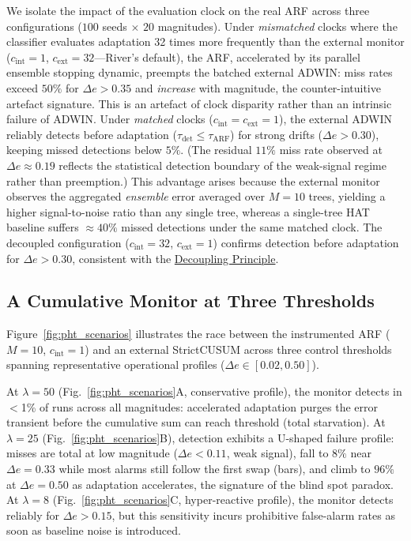 \documentclass[10pt,conference]{IEEEtran}
\theoremstyle{definition}
\begin{document}
We isolate the impact of the evaluation clock on the real ARF across three configurations ($100$ seeds $\times$ $20$ magnitudes). Under \emph{mismatched} clocks where the classifier evaluates adaptation 32 times more frequently than the external monitor ($c_{\mathrm{int}}{=}1$, $c_{\mathrm{ext}}{=}32$---River's default), the ARF, accelerated by its parallel ensemble stopping dynamic, preempts the batched external ADWIN: miss rates exceed $50\%$ for $\Delta e > 0.35$ and \emph{increase} with magnitude, the counter-intuitive artefact signature. This is an artefact of clock disparity rather than an intrinsic failure of ADWIN. Under \emph{matched} clocks ($c_{\mathrm{int}}{=}c_{\mathrm{ext}}{=}1$), the external ADWIN reliably detects before adaptation ($\tau_{\mathrm{det}} \le \tau_{\mathrm{ARF}}$) for strong drifts ($\Delta e > 0.30$), keeping missed detections below $5\%$. (The residual $11\%$ miss rate observed at $\Delta e \approx 0.19$ reflects the statistical detection boundary of the weak-signal regime rather than preemption.) This advantage arises because the external monitor observes the aggregated \emph{ensemble} error averaged over $M{=}10$ trees, yielding a higher signal-to-noise ratio than any single tree, whereas a single-tree HAT baseline suffers ${\approx}40\%$ missed detections under the same matched clock. The decoupled configuration ($c_{\mathrm{int}}{=}32$, $c_{\mathrm{ext}}{=}1$) confirms detection before adaptation for $\Delta e > 0.30$, consistent with the \hyperref[def:decoupling]{Decoupling Principle}.

\subsection{A Cumulative Monitor at Three Thresholds}\label{sec:complexity}

Figure~\ref{fig:pht_scenarios} illustrates the race between the instrumented ARF ($M = 10$, $c_{\mathrm{int}} = 1$) and an external StrictCUSUM across three control thresholds spanning representative operational profiles ($\Delta e \in [0.02, 0.50]$).

At $\lambda = 50$ (Fig.~\ref{fig:pht_scenarios}A, conservative profile), the monitor detects in $<$1\% of runs across all magnitudes: accelerated adaptation purges the error transient before the cumulative sum can reach threshold (total starvation). At $\lambda = 25$ (Fig.~\ref{fig:pht_scenarios}B), detection exhibits a U-shaped failure profile: misses are total at low magnitude ($\Delta e < 0.11$, weak signal), fall to $8\%$ near $\Delta e = 0.33$ while most alarms still follow the first swap (bars), and climb to $96\%$ at $\Delta e = 0.50$ as adaptation accelerates, the signature of the blind spot paradox. At $\lambda = 8$ (Fig.~\ref{fig:pht_scenarios}C, hyper-reactive profile), the monitor detects reliably for $\Delta e > 0.15$, but this sensitivity incurs prohibitive false-alarm rates as soon as baseline noise is introduced.
\end{document}
